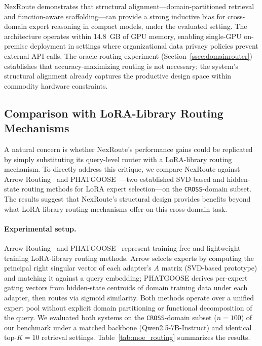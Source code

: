 \documentclass[a4paper,fleql,doubleblind]{cas-sc}
\begin{document}
NexRoute demonstrates that structural alignment---domain-partitioned retrieval
and function-aware scaffolding---can provide a strong inductive bias for
cross-domain expert reasoning in compact models, under the evaluated setting.
The architecture operates within 14.8~GB of GPU memory, enabling single-GPU
on-premise deployment in settings where organizational data privacy policies
prevent external API calls.
The oracle routing experiment (Section~\ref{ssec:domainrouter}) establishes that
accuracy-maximizing routing is not necessary; the system's structural alignment
already captures the productive design space within commodity hardware constraints.

\subsection{Comparison with LoRA-Library Routing Mechanisms}
\label{ssec:moe_routing}

A natural concern is whether NexRoute's performance gains could be replicated
by simply substituting its query-level router with a LoRA-library routing
mechanism. To directly address this critique, we
compare NexRoute against Arrow Routing~\citep{arrow2024routing} and
PHATGOOSE~\citep{muqeeth2024phatgoose}---two established SVD-based and
hidden-state routing methods for LoRA expert selection---on the \texttt{CROSS}-domain subset.
The results suggest that NexRoute's structural design provides benefits
beyond what LoRA-library routing mechanisms offer on this cross-domain task.

\paragraph{Experimental setup.}
Arrow Routing~\citep{arrow2024routing} and PHATGOOSE~\citep{muqeeth2024phatgoose}
represent training-free and lightweight-training LoRA-library routing methods.
Arrow selects experts by computing the principal right singular vector of each
adapter's $A$ matrix (SVD-based prototype) and matching it against a query
embedding; PHATGOOSE derives per-expert gating vectors from hidden-state
centroids of domain training data under each adapter, then routes via
sigmoid similarity. Both methods
operate over a unified expert pool without explicit domain partitioning or functional
decomposition of the query. We evaluated both systems on the \texttt{CROSS}-domain
subset ($n{=}100$) of our benchmark under a matched backbone
(Qwen2.5-7B-Instruct) and identical top-$K{=}10$ retrieval settings.
Table~\ref{tab:moe_routing} summarizes the results.
\end{document}
